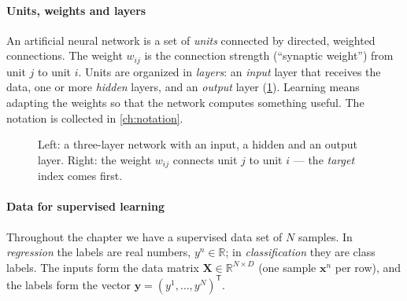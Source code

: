 \documentclass[11pt, oneside]{book}
\newcommand{\R}{\mathbb{R}}
\newcommand{\T}{^{\mathsf{T}}}           %
\newcommand{\bx}{\bm{x}}        \newcommand{\by}{\bm{y}}
\newcommand{\bX}{\bm{X}}        \newcommand{\bY}{\bm{Y}}
\begin{document}
\paragraph{Units, weights and layers}
An artificial neural network is a set of \emph{units} connected by directed,
weighted connections. The weight $w_{ij}$ is the connection strength
(``synaptic weight'') from unit $j$ to unit $i$. Units are organized in
\emph{layers}: an \emph{input} layer that receives the data, one or more
\emph{hidden} layers, and an \emph{output} layer (\cref{fig:three-layer}).
Learning means adapting the weights so that the network computes something
useful. The notation is collected in \cref{ch:notation}.

\begin{figure}[htbp]
\centering
{}
\caption{Left: a three-layer network with an input, a hidden and an output
layer. Right: the weight $w_{ij}$ connects unit $j$ to unit $i$ --- the
\emph{target} index comes first.}
\label{fig:three-layer}
\end{figure}

\paragraph{Data for supervised learning}
Throughout the chapter we have a supervised data set of $N$ samples. In
\emph{regression} the labels are real numbers, $y^n \in \R$; in
\emph{classification} they are class labels. The inputs form the data
matrix $\bX \in \R^{N \times D}$ (one sample $\bx^n$ per row), and the labels
form the vector $\by = (y^1, \dots, y^N)\T$.
\end{document}
